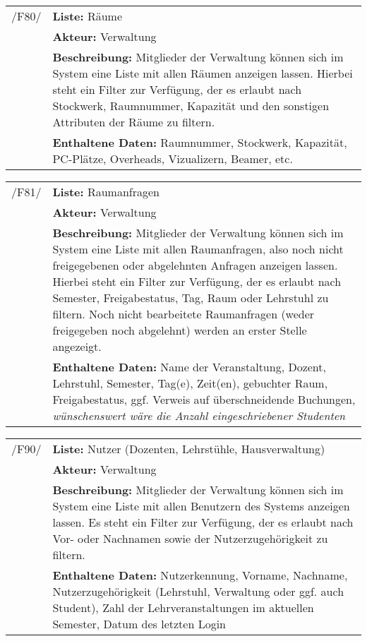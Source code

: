 \begin{tabular}{p{1.5cm}p{14.5cm}}
		
	 /F80/	& \textbf{Liste:} Räume \\
				& \textbf{Akteur:} Verwaltung \\
				& \textbf{Beschreibung:} Mitglieder der Verwaltung können sich im System eine Liste mit allen Räumen anzeigen lassen. Hierbei steht ein Filter zur Verfügung, der es erlaubt nach Stockwerk, Raumnummer, Kapazität und den sonstigen Attributen der Räume zu filtern. \\
				& \textbf{Enthaltene Daten:} Raumnummer, Stockwerk, Kapazität, PC-Plätze, Overheads, Vizualizern, Beamer, etc. \\[0.25cm]

\end{tabular}

\begin{tabular}{p{1.5cm}p{14.5cm}}
		
	 /F81/	& \textbf{Liste:} Raumanfragen \\
				& \textbf{Akteur:} Verwaltung \\
				& \textbf{Beschreibung:} Mitglieder der Verwaltung können sich im System eine Liste mit allen Raumanfragen, also noch nicht freigegebenen oder abgelehnten Anfragen anzeigen lassen. Hierbei steht ein Filter zur Verfügung, der es erlaubt nach Semester, Freigabestatus, Tag, Raum oder Lehrstuhl zu filtern. Noch nicht bearbeitete Raumanfragen (weder freigegeben noch abgelehnt) werden an erster Stelle angezeigt. \\
				& \textbf{Enthaltene Daten:} Name der Veranstaltung, Dozent, Lehrstuhl, Semester, Tag(e), Zeit(en), gebuchter Raum, Freigabestatus, ggf. Verweis auf überschneidende Buchungen, \textsl{wünschenswert wäre die Anzahl eingeschriebener Studenten} \\[0.25cm]

\end{tabular}


\begin{tabular}{p{1.5cm}p{14.5cm}}
					
	 /F90/	& \textbf{Liste:} Nutzer (Dozenten, Lehrstühle, Hausverwaltung) \\
				& \textbf{Akteur:} Verwaltung \\
				& \textbf{Beschreibung:} Mitglieder der Verwaltung können sich im System eine Liste mit allen Benutzern des Systems anzeigen lassen. Es steht ein Filter zur Verfügung, der es erlaubt nach Vor- oder Nachnamen sowie der Nutzerzugehörigkeit zu filtern.\\
				& \textbf{Enthaltene Daten:} Nutzerkennung, Vorname, Nachname, Nutzerzugehörigkeit (Lehrstuhl, Verwaltung oder ggf. auch Student), Zahl der Lehrveranstaltungen im aktuellen Semester, Datum des letzten Login \\[0.25cm]

\end{tabular}


